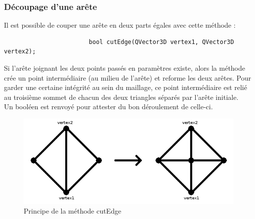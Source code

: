 \documentclass[a4paper]{memoir}
\begin{document}
				\subsubsection{Découpage d'une arête}
					Il est possible de couper une arête en deux parts égales avec cette méthode :
					\begin{verbatim}
						bool cutEdge(QVector3D vertex1, QVector3D vertex2);
					\end{verbatim}
					Si l'arête joignant les deux points passés en paramètres existe, alors la méthode crée un point intermédiaire (au milieu de l'arête) et
					reforme les deux arêtes. Pour garder une certaine intégrité au sein du maillage, ce point intermédiaire est relié au troisième sommet 
					de chacun des deux triangles séparés par l'arête initiale.\\
					Un booléen est renvoyé pour attester du bon déroulement de celle-ci.
					\begin{figure}[H]
						\begin{center}
							\includegraphics[scale=0.55]{img/cutEdge.png}
							\caption{Principe de la méthode cutEdge}
						\end{center}
					\end{figure}
					
\end{document}
